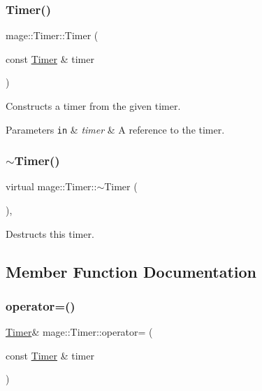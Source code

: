 \subsubsection{\texorpdfstring{Timer()}{Timer()}\hspace{0.1cm}{\footnotesize\ttfamily [2/2]}}
{\footnotesize\ttfamily mage\+::\+Timer\+::\+Timer (\begin{DoxyParamCaption}\item[{const \hyperlink{classmage_1_1_timer}{Timer} \&}]{timer }\end{DoxyParamCaption})\hspace{0.3cm}{\ttfamily [default]}}

Constructs a timer from the given timer.


\begin{DoxyParams}[1]{Parameters}
\mbox{\tt in}  & {\em timer} & A reference to the timer. \\
\hline
\end{DoxyParams}
\hypertarget{classmage_1_1_timer_aa301aff0cc5adb2e0cf128e6ad4c2774}{}\label{classmage_1_1_timer_aa301aff0cc5adb2e0cf128e6ad4c2774} 
\subsubsection{\texorpdfstring{$\sim$\+Timer()}{~Timer()}}
{\footnotesize\ttfamily virtual mage\+::\+Timer\+::$\sim$\+Timer (\begin{DoxyParamCaption}{ }\end{DoxyParamCaption})\hspace{0.3cm}{\ttfamily [virtual]}, {\ttfamily [default]}}

Destructs this timer. 

\subsection{Member Function Documentation}
\hypertarget{classmage_1_1_timer_ae83df63d5ff9eec370eddf208ac2077e}{}\label{classmage_1_1_timer_ae83df63d5ff9eec370eddf208ac2077e} 
\subsubsection{\texorpdfstring{operator=()}{operator=()}}
{\footnotesize\ttfamily \hyperlink{classmage_1_1_timer}{Timer}\& mage\+::\+Timer\+::operator= (\begin{DoxyParamCaption}\item[{const \hyperlink{classmage_1_1_timer}{Timer} \&}]{timer }\end{DoxyParamCaption})\hspace{0.3cm}{\ttfamily [default]}}

